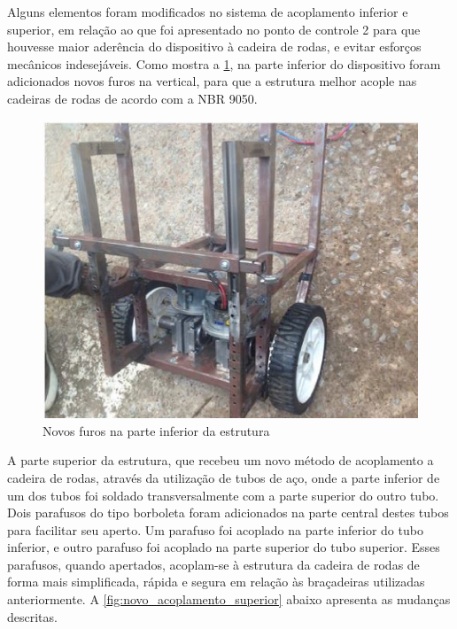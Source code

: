Alguns elementos foram modificados no sistema de acoplamento inferior e superior, em relação ao que foi apresentado no ponto de controle 2 para que houvesse maior aderência do dispositivo à cadeira de rodas, e evitar esforços mecânicos indesejáveis. Como mostra a \ref{fig:furos_estrutura}, na parte inferior do dispositivo foram adicionados novos furos na vertical, para que a estrutura melhor acople nas cadeiras de rodas de acordo com a NBR 9050.

\begin{figure}[!htb]
\centering
\includegraphics[keepaspectratio=true,scale=0.7]{figuras/resultados/furos_estrutura}
\caption{Novos furos na parte inferior da estrutura}
\label{fig:furos_estrutura}
\end{figure}

A parte superior da estrutura, que recebeu um novo método de acoplamento a cadeira de rodas, através da utilização de tubos de aço, onde a parte inferior de um dos tubos foi soldado transversalmente com a parte superior do outro tubo. Dois parafusos do tipo borboleta foram adicionados na parte central destes tubos para facilitar seu aperto. Um parafuso foi acoplado na parte inferior do tubo inferior, e outro parafuso foi acoplado na parte superior do tubo superior. Esses parafusos, quando apertados, acoplam-se à estrutura da cadeira de rodas de forma mais simplificada, rápida e segura em relação às braçadeiras utilizadas anteriormente. A \ref{fig:novo_acoplamento_superior} abaixo apresenta as mudanças descritas.


